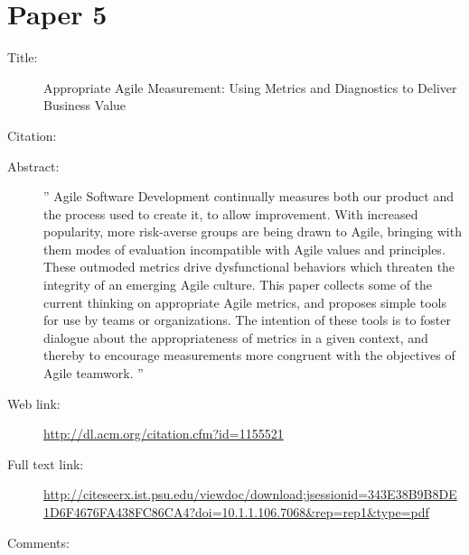 \documentclass{scrartcl}
\begin{document}
\section*{Paper 5}
\begin{description}
	\item[Title:] Appropriate Agile Measurement: Using Metrics and Diagnostics to Deliver Business Value
	\item[Citation:] \cite{Hartmann}
	\item[Abstract:] '' Agile Software Development continually measures both our product and the process used to create it, to allow improvement. With increased popularity, more risk-averse groups are being drawn to Agile, bringing with them modes of evaluation incompatible with Agile values and principles. These outmoded metrics drive dysfunctional behaviors which threaten the integrity of an emerging Agile culture. This paper collects some of the current thinking on appropriate Agile metrics, and proposes simple tools for use by teams or organizations. The intention of these tools is to foster dialogue about the appropriateness of metrics in a given context, and thereby to encourage measurements more congruent with the objectives of Agile teamwork. ''
	\item[Web link:] \url{http://dl.acm.org/citation.cfm?id=1155521}
	\item[Full text link:] \url{http://citeseerx.ist.psu.edu/viewdoc/download;jsessionid=343E38B9B8DE1D6F4676FA438FC86CA4?doi=10.1.1.106.7068&rep=rep1&type=pdf}
	\item[Comments:] 
\end{description}
\end{document}

